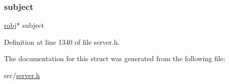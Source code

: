 \mbox{\label{structset_type_iterator_a8bd087874443f3e41cf5f728d8490693}} 
\subsubsection{\texorpdfstring{subject}{subject}}
{\footnotesize\ttfamily \hyperlink{server_8h_a540f174d2685422fbd7d12e3cd44c8e2}{robj}$\ast$ subject}



Definition at line 1340 of file server.\+h.



The documentation for this struct was generated from the following file\+:\begin{DoxyCompactItemize}
\item 
src/\hyperlink{server_8h}{server.\+h}\end{DoxyCompactItemize}
